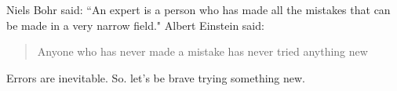 \documentclass{article}
\begin{document}
Niels Bohr said: ``An expert is a person who has made all the mistakes that can be made in a very narrow field."
Albert Einstein said:
\begin{quote}
Anyone who has never made a mistake has never tried anything new
\end{quote}

Errors are inevitable. So. let's be brave trying something new.
\end{document}
